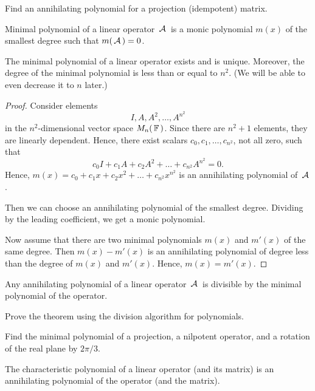 \begin{exercise}
Find an annihilating polynomial for a projection (idempotent) matrix.
\end{exercise}

\begin{definition}
Minimal polynomial of a linear operator $\,\mathcal{A}\,$ is a monic polynomial $m(x)$ of the smallest degree such that $m(\,\mathcal{A}\,) = 0$.
\end{definition}

\begin{theorem}
The minimal polynomial of a linear operator exists and is unique. Moreover, the degree of the minimal polynomial is less than or equal to $n^2$. (We will be able to even decrease it to $n$ later.)
\end{theorem}

\begin{proof}
Consider elements 
$$
I, A, A^2, \ldots, A^{n^2}
$$
in the $n^2$-dimensional vector space $M_n(\,\mathbb{F}\,)$. Since there are $n^2 + 1$ elements, they are linearly dependent. Hence, there exist scalars $c_0, c_1, \ldots, c_{n^2}$, not all zero, such that 
$$
c_0 I + c_1 A + c_2 A^2 + \ldots + c_{n^2} A^{n^2} = 0.
$$
Hence, $m(x) = c_0 + c_1 x + c_2 x^2 + \ldots + c_{n^2} x^{n^2}$ is an annihilating polynomial of $\,\mathcal{A}\,$.

Then we can choose an annihilating polynomial of the smallest degree. Dividing by the leading coefficient, we get a monic polynomial.

Now assume that there are two minimal polynomials $m(x)$ and $m'(x)$ of the same degree. Then $m(x) - m'(x)$ is an annihilating polynomial of degree less than the degree of $m(x)$ and $m'(x)$. Hence, $m(x) = m'(x)$.
\end{proof}

\begin{theorem}
Any annihilating polynomial of a linear operator $\,\mathcal{A}\,$ is divisible by the minimal polynomial of the operator.
\end{theorem}

\begin{exercise}
Prove the theorem using the division algorithm for polynomials.
\end{exercise}

\begin{exercise}
Find the minimal polynomial of a projection, a nilpotent operator, and a rotation of the real plane by $2\pi/3$.
\end{exercise}

\begin{theorem}
The characteristic polynomial of a linear operator (and its matrix) is an annihilating polynomial of the operator (and the matrix).
\end{theorem}

